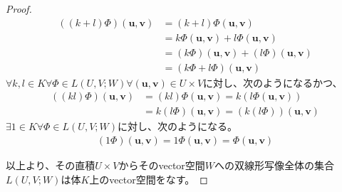 \documentclass[dvipdfmx]{jsarticle}
\begin{document}
\begin{proof}
\begin{align*}
\left( (k + l)\varPhi \right)\left( \mathbf{u},\mathbf{v} \right) &= (k + l)\varPhi\left( \mathbf{u},\mathbf{v} \right)\\
&= k\varPhi\left( \mathbf{u},\mathbf{v} \right) + l\varPhi\left( \mathbf{u},\mathbf{v} \right)\\
&= (k\varPhi)\left( \mathbf{u},\mathbf{v} \right) + (l\varPhi)\left( \mathbf{u},\mathbf{v} \right)\\
&= (k\varPhi + l\varPhi)\left( \mathbf{u},\mathbf{v} \right)
\end{align*}
$\forall k,l \in K\forall\varPhi \in L(U,V;W)\forall\left( \mathbf{u},\mathbf{v} \right) \in U \times V$に対し、次のようになるかつ、
\begin{align*}
\left( (kl)\varPhi \right)\left( \mathbf{u},\mathbf{v} \right) &= (kl)\varPhi\left( \mathbf{u},\mathbf{v} \right) = k\left( l\varPhi\left( \mathbf{u},\mathbf{v} \right) \right)\\
&= k(l\varPhi)\left( \mathbf{u},\mathbf{v} \right) = \left( k(l\varPhi) \right)\left( \mathbf{u},\mathbf{v} \right)
\end{align*}
$\exists 1 \in K\forall\varPhi \in L(U,V;W)$に対し、次のようになる。
\begin{align*}
(1\varPhi)\left( \mathbf{u},\mathbf{v} \right) = 1\varPhi\left( \mathbf{u},\mathbf{v} \right) = \varPhi\left( \mathbf{u},\mathbf{v} \right)
\end{align*}\par
以上より、その直積$U \times V$からそのvector空間$W$への双線形写像全体の集合$L(U,V;W)$は体$K$上のvector空間をなす。
\end{proof}
\end{document}
